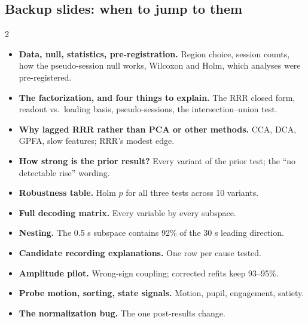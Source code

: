 \documentclass[10pt]{article}
\begin{document}
\subsection*{Backup slides: when to jump to them}
\begin{multicols}{2}\small\raggedright
\begin{itemize}
\item \textbf{Data, null, statistics, pre-registration.} Region choice, session counts, how the pseudo-session null
works, Wilcoxon and Holm, which analyses were pre-registered.
\item \textbf{The factorization, and four things to explain.} The RRR closed form, readout vs.\ loading basis,
pseudo-sessions, the intersection--union test.
\item \textbf{Why lagged RRR rather than PCA or other methods.} CCA, DCA, GPFA, slow features; RRR's modest edge.
\item \textbf{How strong is the prior result?} Every variant of the prior test; the ``no detectable rise'' wording.
\item \textbf{Robustness table.} Holm $p$ for all three tests across 10 variants.
\item \textbf{Full decoding matrix.} Every variable by every subspace.
\item \textbf{Nesting.} The 0.5 s subspace contains 92\% of the 30 s leading direction.
\item \textbf{Candidate recording explanations.} One row per cause tested.
\item \textbf{Amplitude pilot.} Wrong-sign coupling; corrected refits keep 93--95\%.
\item \textbf{Probe motion, sorting, state signals.} Motion, pupil, engagement, satiety.
\item \textbf{The normalization bug.} The one post-results change.
\end{itemize}
\end{multicols}
\end{document}
